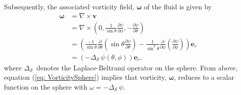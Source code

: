 \documentclass{sfuthesis}
\begin{document}
Subsequently, the associated vorticity field, $\bm{\omega}$ of the fluid is given by
\begin{align}
	\bm{\omega}&=\nabla \times \mathbf{v} \nonumber \\
                           &=\nabla \times \left(0, \frac{1}{\sin\theta}\frac{\partial \psi}{\partial \phi}, -\frac{\partial \psi}{\partial \theta}\right) \nonumber \\
                           &=\left(\frac{-1}{\sin\theta}\frac{\partial}{\partial \theta}\left(\sin\theta\frac{\partial \psi}{\partial\theta}\right) - \frac{1}{{\sin}^2\theta}\frac{\partial}{\partial \phi}\left(\frac{\partial \psi}{\partial \phi}\right)\right){\mathbf{e}}_r \nonumber \\
                           &=\left(-{\Delta}_{\mathcal{S} \ }\psi(\theta,\phi)\right){\mathbf{e}}_r,  \label{eq: VorticitySphere}
\end{align}
where ${\Delta}_{\mathcal{S} \ }$ denotes the Laplace-Beltrami operator on the sphere. From above, equation (\ref{eq: VorticitySphere}) implies that vorticity, $\bm{\omega}$, reduces to a scalar function on the sphere with $\omega=-{\Delta}_{\mathcal{S} \ } \psi$.  
\end{document}

